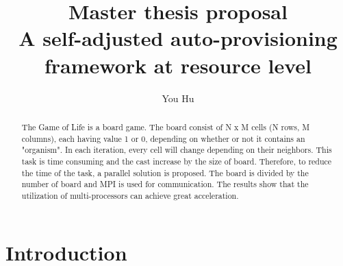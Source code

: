 \documentclass[sigchi]{acmart}
\begin{document}
\title{Master thesis proposal \\
       A self-adjusted auto-provisioning framework at resource level}

\author{You Hu}



\renewcommand{\shortauthors}{You Hu}

\begin{abstract}

The Game of Life is a board game. The board consist of N x M cells (N rows, M columns), each having value 1 or 0, depending on whether or not it contains an "organism". 
In each iteration, every cell will change depending on their neighbors. 
This task is time consuming and the cast increase by the size of board.
Therefore, to reduce the time of the task, a parallel solution is proposed. 
The board is divided by the number of board and MPI is used for communication.
The results show that the utilization of multi-processors can achieve great acceleration. 
 
\end{abstract}




\maketitle

\section{Introduction}
\end{document}
